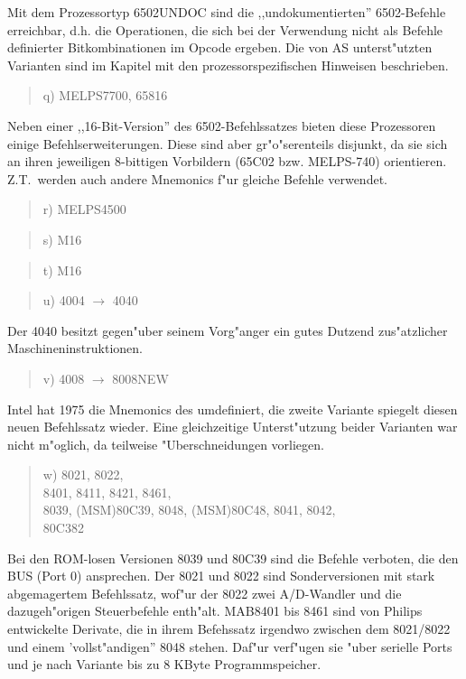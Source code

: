 \documentclass[12pt,a4paper,twoside]{report}
\begin{document}
Mit dem Prozessortyp 6502UNDOC sind die ,,undokumentierten''
6502-Befehle erreichbar, d.h. die Operationen, die sich bei der Verwendung
nicht als Befehle definierter Bitkombinationen im Opcode ergeben.  Die von
AS unterst"utzten Varianten sind im Kapitel mit den prozessorspezifischen
Hinweisen beschrieben.
\begin{quote}
q) MELPS7700, 65816
\end{quote}
Neben einer ,,16-Bit-Version'' des 6502-Befehlssatzes bieten diese
Prozessoren einige Befehlserweiterungen.  Diese sind aber gr"o"serenteils
disjunkt, da sie sich an ihren jeweiligen 8-bittigen Vorbildern (65C02
bzw. MELPS-740) orientieren.  Z.T.~werden auch andere Mnemonics f"ur
gleiche Befehle verwendet.
\begin{quote}
r) MELPS4500
\end{quote}
\begin{quote}
s) M16
\end{quote}
\begin{quote}
t) M16
\end{quote}
\begin{quote}
u) 4004 $\rightarrow$ 4040
\end{quote}
Der 4040 besitzt gegen"uber seinem Vorg"anger ein gutes Dutzend
zus"atzlicher Maschineninstruktionen.
\begin{quote}
v) 4008 $\rightarrow$ 8008NEW
\end{quote}
Intel hat 1975 die Mnemonics des umdefiniert, die zweite Variante spiegelt
diesen neuen Befehlssatz wieder.  Eine gleichzeitige Unterst"utzung beider
Varianten war nicht m"oglich, da teilweise "Uberschneidungen vorliegen.
\begin{quote}
w) 8021, 8022, \\
   8401, 8411, 8421, 8461, \\
   8039, (MSM)80C39, 8048, (MSM)80C48, 8041, 8042, \\
   80C382
\end{quote}
Bei den ROM-losen Versionen 8039 und 80C39 sind die Befehle verboten,
die den BUS (Port 0) ansprechen.  Der 8021 und 8022 sind Sonderversionen
mit stark abgemagertem Befehlssatz, wof"ur der 8022 zwei A/D-Wandler
und die dazugeh"origen Steuerbefehle enth"alt.  MAB8401 bis 8461 sind von
Philips entwickelte Derivate, die in ihrem Befehssatz irgendwo zwischen
dem 8021/8022 und einem 'vollst"andigen'' 8048 stehen.  Daf"ur verf"ugen
sie "uber serielle Ports und je nach Variante bis zu 8 KByte Programmspeicher.
\end{document}
